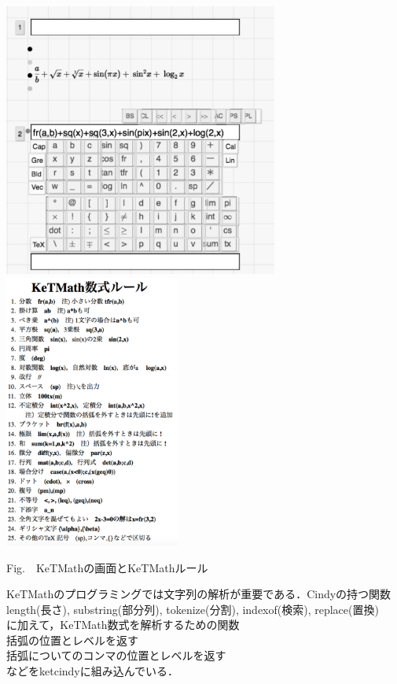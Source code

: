 \documentclass[a4j,12pt]{ujarticle}
\begin{document}
\begin{center}
\includegraphics[bb=0.00 0.00 661.00 660.00,height=90mm]{fig/ketmathbw.pdf}\hspace{5mm}
\includegraphics[bb=0.00 0.00 463.00 723.00,height=90mm]{fig/ketmathrule.pdf}\\
\addtocounter{figure}{1}Fig.\thefigure\ \ KeTMathの画面とKeTMathルール\vspace{-1mm}
\end{center}

KeTMathのプログラミングでは文字列の解析が重要である．Cindyの持つ関数\\
\hspace*{2zw}length(長さ), substring(部分列), tokenize(分割), indexof(検索), %
replace(置換)\\
に加えて，KeTMath数式を解析するための関数\\
\hspace*{2zw}括弧の位置とレベルを返す\\
\hspace*{2zw}括弧についてのコンマの位置とレベルを返す\\
などをketcindyに組み込んでいる．
\end{document}
